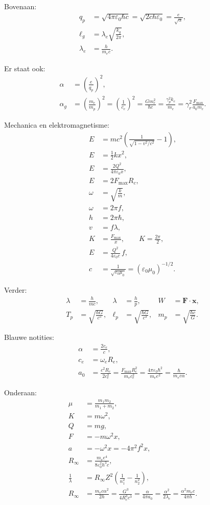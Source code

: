 \documentclass[11pt,a4paper]{article}
\newcommand{\vect}[1]{\mathbf{#1}}
\begin{document}
Bovenaan:
\begin{align*}
q_p
&=
\sqrt{4\pi\varepsilon_0\hbar c}
=
\sqrt{2ch\varepsilon_0}
=
\frac{e}{\sqrt{\alpha}},\\
\ell_g
&=
\lambda_e\sqrt{\frac{k_g}{2\pi}},\\
\lambda_e
&=
\frac{h}{m_ec}.
\end{align*}

Er staat ook:
\begin{align*}
\alpha
&=
\left(\frac{e}{q_p}\right)^2,\\
\alpha_g
&=
\left(\frac{m_e}{m_p}\right)^2
=
\left(\frac{1}{c_e}\right)^2
=
\frac{Gm_e^2}{\hbar c}
=
\frac{\gamma_p^2 k_e}{m_e}
=
\gamma_r^2\frac{F_{\max}}{a_0m_e}.
\end{align*}

Mechanica en elektromagnetisme:
\begin{align*}
E&=mc^2\left(\frac{1}{\sqrt{1-v^2/c^2}}-1\right),\\
E&=\frac{1}{2}kx^2,\\
E&=\frac{2Q^2}{4\pi\varepsilon_0x},\\
E&=2F_{\max}R_c,\\
\omega&=\sqrt{\frac{k}{m}},\\
\omega&=2\pi f,\\
h&=2\pi\hbar,\\
v&=f\lambda,\\
K&=\frac{F_{\max}}{x},\qquad
K=\frac{2\pi}{2},\\
E&=\frac{Q^2}{4\varepsilon_0 c}\,f,\\
c&=\frac{1}{\sqrt{\varepsilon_0\mu_0}}
=(\varepsilon_0\mu_0)^{-1/2}.
\end{align*}

Verder:
\begin{align*}
\lambda&=\frac{h}{mc},&
\lambda&=\frac{h}{p},&
W&=\vect{F}\cdot\vect{x},\\
T_p&=\sqrt{\frac{\hbar G}{c^5}},&
\ell_p&=\sqrt{\frac{\hbar G}{c^3}},&
m_p&=\sqrt{\frac{\hbar c}{G}}.
\end{align*}

Blauwe notities:
\begin{align*}
\alpha &= \frac{2c_e}{c},\\
c_e &= \omega_e R_e,\\
a_0
&=
\frac{c^2R_c}{2c_e^2}
=
\frac{F_{\max}R_c^2}{m_ec_e^2}
=
\frac{4\pi\varepsilon_0\hbar^2}{m_ee^2}
=
\frac{\hbar}{m_ec\alpha}.
\end{align*}

Onderaan:
\begin{align*}
\mu&=\frac{m_1m_2}{m_1+m_2},\\
K&=m\omega^2,\\
Q&=mg,\\
F&=-m\omega^2x,\\
a&=-\omega^2x=-4\pi^2f^2x,\\
R_\infty
&=
\frac{m_ee^4}{8\varepsilon_0^2h^3c},\\
\frac{1}{\lambda}
&=
R_\infty Z^2\left(\frac{1}{n_1^2}-\frac{1}{n_2^2}\right),\\
R_\infty
&=
\frac{m_ec\alpha^2}{2h}
=
\frac{G^3}{4R_c^3c^3}
=
\frac{\alpha}{4\pi a_0}
=
\frac{\alpha^2}{2\lambda_e}
=
\frac{\alpha^2m_ec}{4\pi h}.
\end{align*}
\end{document}
